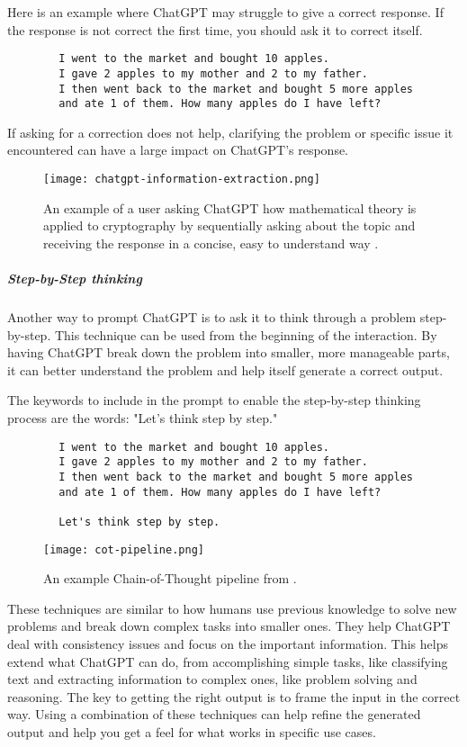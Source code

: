 \documentclass[12pt]{article}
\begin{document}
    Here is an example where ChatGPT may struggle to give a correct response. If the response is not correct the first time, you should ask it to correct itself.
    \begin{verbatim}
        I went to the market and bought 10 apples.
        I gave 2 apples to my mother and 2 to my father. 
        I then went back to the market and bought 5 more apples 
        and ate 1 of them. How many apples do I have left?
    \end{verbatim}
    If asking for a correction does not help, clarifying the problem or specific issue it encountered can have a large impact on ChatGPT's response.

    \begin{figure}[H]
      \centering
      \texttt{[image: chatgpt-information-extraction.png]}
      \caption{An example of a user asking ChatGPT how mathematical theory is applied to cryptography by sequentially asking about the topic and receiving the response in a concise, easy to understand way \cite{introducing_chatgpt_2022}.}
      \label{fig:chatgpt fermat}
    \end{figure}

\subparagraph{Step-by-Step thinking}
 Another way to prompt ChatGPT is to ask it to think through a problem step-by-step. This technique can be used from the beginning of the interaction. By having ChatGPT break down the problem into smaller, more manageable parts, it can better understand the problem and help itself generate a correct output.

    The keywords to include in the prompt to enable the step-by-step thinking process are the words: "Let's think step by step."
     \begin{verbatim}
        I went to the market and bought 10 apples.
        I gave 2 apples to my mother and 2 to my father. 
        I then went back to the market and bought 5 more apples 
        and ate 1 of them. How many apples do I have left?
    
        Let's think step by step.
     \end{verbatim}

\begin{figure}[H]
  \centering
  \texttt{[image: cot-pipeline.png]}
  \caption{An example Chain-of-Thought pipeline from \cite{kojima2023large}.}
  \label{fig:biased code snippet}
\end{figure}

These techniques are similar to how humans use previous knowledge to solve new problems and break down complex tasks into smaller ones. They help ChatGPT deal with consistency issues and focus on the important information. This helps extend what ChatGPT can do, from accomplishing simple tasks, like classifying text and extracting information to complex ones, like problem solving and reasoning. The key to getting the right output is to frame the input in the correct way. Using a combination of these techniques can help refine the generated output and help you get a feel for what works in specific use cases.
\end{document}
